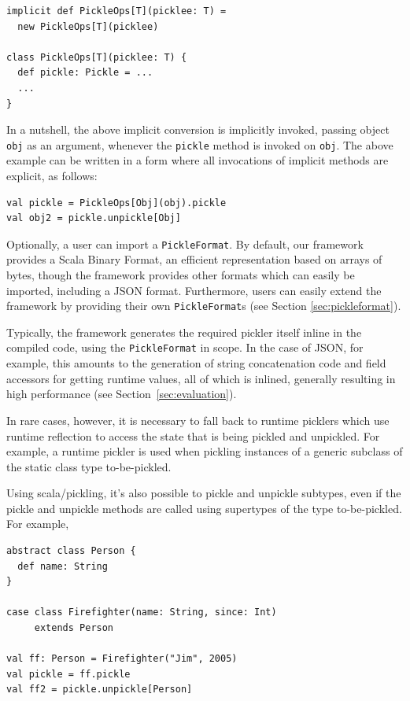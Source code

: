 \documentclass[10pt]{sigplanconf}
\theoremstyle{definition}
\theoremstyle{definition}
\newcommand{\term}[1]{\mbox{\texttt{#1}}}
\begin{document}
\begin{lstlisting}
implicit def PickleOps[T](picklee: T) =
  new PickleOps[T](picklee)

class PickleOps[T](picklee: T) {
  def pickle: Pickle = ...
  ...
}
\end{lstlisting}

In a nutshell, the above implicit conversion is implicitly invoked, passing
object \verb|obj| as an argument, whenever the \verb|pickle| method is invoked
on \verb|obj|. The above example can be written in a form where all
invocations of implicit methods are explicit, as follows:

\begin{lstlisting}
val pickle = PickleOps[Obj](obj).pickle
val obj2 = pickle.unpickle[Obj]
\end{lstlisting}


Optionally, a user can
import a \term{PickleFormat}. By default, our framework provides a
Scala Binary Format, an efficient representation based on arrays of bytes,
though the framework provides other formats which can easily be imported,
including a JSON format. Furthermore, users can easily extend the framework by
providing their own \term{PickleFormat}s (see Section \ref{sec:pickleformat}).

Typically, the framework generates the required pickler itself inline in the
compiled code, using the \term{PickleFormat} in scope. In the case of JSON,
for example, this amounts to the generation of string concatenation code and
field accessors for getting runtime values, all of which is inlined, generally resulting
in high performance (see Section~\ref{sec:evaluation}).

In rare cases, however, it is necessary to fall back to runtime picklers which
use runtime reflection to access the state that is being pickled and
unpickled. For example, a runtime pickler is used when pickling instances of a
generic subclass of the static class type to-be-pickled.

Using scala/pickling, it's
also possible to pickle and unpickle subtypes, even if the pickle and unpickle
methods are called using supertypes of the type to-be-pickled.
For example,

\begin{lstlisting}
abstract class Person {
  def name: String
}

case class Firefighter(name: String, since: Int)
     extends Person

val ff: Person = Firefighter("Jim", 2005)
val pickle = ff.pickle
val ff2 = pickle.unpickle[Person]
\end{lstlisting}
\end{document}
